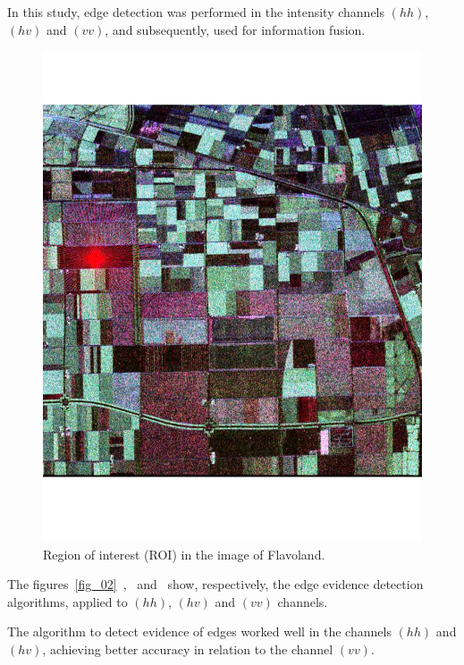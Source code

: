 \documentclass[conference]{IEEEtran}
\begin{document}
In this study, edge detection was performed in the intensity channels $(hh)$, $(hv)$ and $(vv)$, and subsequently, used for information fusion. 
\begin{figure}[hbt]
\centering
	\includegraphics[scale=0.3]{flevoland_radial_4_look.pdf}
			\vspace{-1.0cm}
	\caption{Region of interest (ROI) in the image of Flavoland.}
\label{fig_01}
\end{figure}
The figures~\ref{fig_02}~,~ and~ show, respectively, the edge evidence detection algorithms, applied to $(hh)$, $(hv)$ and $(vv)$ channels. 

The algorithm to detect evidence of edges worked well in the channels $(hh)$ and $(hv)$, achieving better accuracy in relation to the channel $(vv)$.  
\end{document}
